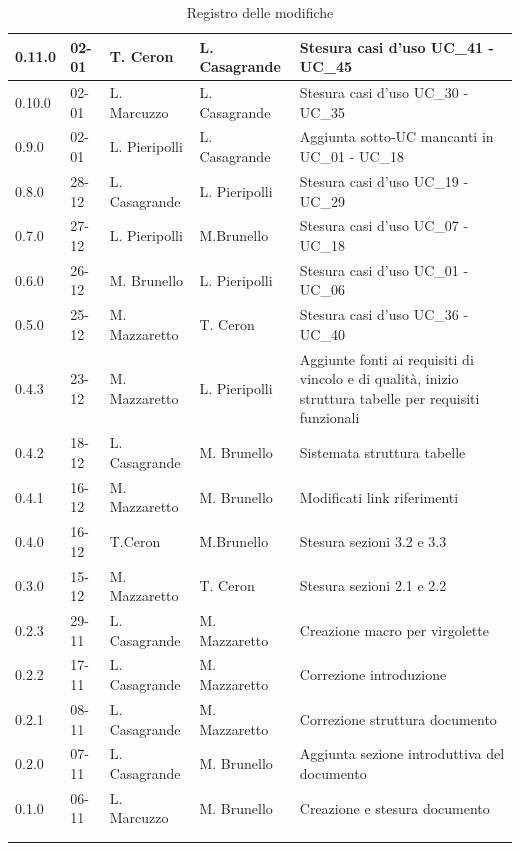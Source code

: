 \begin{longtable}{|p{}|p{}|p{}|p{}|p{}|}
    0.11.0 & 02-01 & T. Ceron & L. Casagrande & Stesura casi d'uso UC\_41 - UC\_45 \\
    \hline
    0.10.0 & 02-01 & L. Marcuzzo & L. Casagrande & Stesura casi d'uso UC\_30 - UC\_35 \\
    \hline
    0.9.0 & 02-01 & L. Pieripolli & L. Casagrande & Aggiunta sotto-UC mancanti in UC\_01 - UC\_18\\
    \hline
    0.8.0 & 28-12 & L. Casagrande & L. Pieripolli & Stesura casi d'uso UC\_19 - UC\_29 \\
    \hline
    0.7.0 & 27-12 & L. Pieripolli & M.Brunello & Stesura casi d'uso UC\_07 - UC\_18 \\
    \hline
    0.6.0 & 26-12 & M. Brunello & L. Pieripolli & Stesura casi d'uso UC\_01 - UC\_06 \\
    \hline
    0.5.0 & 25-12 & M. Mazzaretto & T. Ceron & Stesura casi d'uso UC\_36 - UC\_40 \\
    \hline
    0.4.3 & 23-12 & M. Mazzaretto & L. Pieripolli & Aggiunte fonti ai requisiti di vincolo e di qualità, inizio struttura tabelle per requisiti funzionali \\
    \hline
    0.4.2 & 18-12 & L. Casagrande & M. Brunello & Sistemata struttura tabelle \\
    \hline
    0.4.1 & 16-12 & M. Mazzaretto & M. Brunello & Modificati link riferimenti \\
    \hline
    0.4.0 & 16-12 & T.Ceron & M.Brunello & Stesura sezioni 3.2 e 3.3 \\
    \hline
    0.3.0 & 15-12 & M. Mazzaretto & T. Ceron & Stesura sezioni 2.1 e 2.2 \\
    \hline
    0.2.3 & 29-11 & L. Casagrande & M. Mazzaretto & Creazione macro per virgolette \\
    \hline
    0.2.2 & 17-11 & L. Casagrande & M. Mazzaretto & Correzione introduzione \\
    \hline
    0.2.1 & 08-11 & L. Casagrande & M. Mazzaretto & Correzione struttura documento \\
    \hline
    0.2.0 & 07-11 & L. Casagrande & M. Brunello & Aggiunta sezione introduttiva del documento \\
    \hline
    0.1.0 & 06-11 & L. Marcuzzo & M. Brunello & Creazione e stesura documento \\
    \hline
    
    \multicolumn{5}{c}{} \\
    \caption{Registro delle modifiche}\label{tab:registro_modifiche}\\
\end{longtable}
